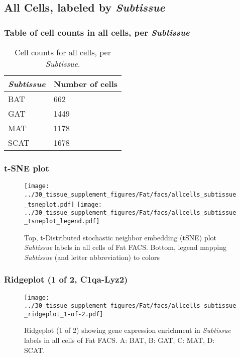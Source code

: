 \clearpage

\subsection{All Cells, labeled by \emph{Subtissue}}
\subsubsection{Table of cell counts in all cells, per \emph{Subtissue}}\begin{table}[h]
\centering
\label{my-label}
\begin{tabular}{@{}ll@{}}
\toprule

\emph{Subtissue}& Number of cells \\ \midrule
BAT & 662 \\

GAT & 1449 \\

MAT & 1178 \\

SCAT & 1678 \\
\bottomrule
\end{tabular}
\caption{Cell counts for all cells, per \emph{Subtissue}.}
\end{table}

\clearpage
\subsubsection{t-SNE plot}
\begin{figure}[h]
\centering
\texttt{[image: ../30\_tissue\_supplement\_figures/Fat/facs/allcells\_subtissue\_tsneplot.pdf]}
\texttt{[image: ../30\_tissue\_supplement\_figures/Fat/facs/allcells\_subtissue\_tsneplot\_legend.pdf]}
\caption{Top, t-Distributed stochastic neighbor embedding (tSNE) plot  \emph{Subtissue} labels in all cells of Fat FACS. Bottom, legend mapping \emph{Subtissue} (and letter abbreviation) to colors}
\end{figure}


\clearpage

\subsubsection{Ridgeplot (1 of 2, C1qa-Lyz2)}
\begin{figure}[h]
\centering
\texttt{[image: ../30\_tissue\_supplement\_figures/Fat/facs/allcells\_subtissue\_ridgeplot\_1-of-2.pdf]}

\caption{ Ridgeplot (1 of 2)  showing gene expression enrichment in \emph{Subtissue} labels in all cells of Fat FACS. A: BAT, B: GAT, C: MAT, D: SCAT.}
\end{figure}


